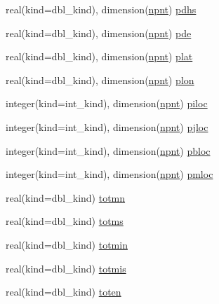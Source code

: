 \begin{DoxyCompactItemize}
\item 
real(kind=dbl\_\-kind), dimension(\hyperlink{namespaceice__diagnostics_aab9ed37bb736e9c83d4bf276c8010dc2}{npnt}) \hyperlink{namespaceice__diagnostics_aafb0c3e7a68ebfdd564e56305618c799}{pdhs}
\item 
real(kind=dbl\_\-kind), dimension(\hyperlink{namespaceice__diagnostics_aab9ed37bb736e9c83d4bf276c8010dc2}{npnt}) \hyperlink{namespaceice__diagnostics_afaeca519ef7de2238cb47f6f1b6c3032}{pde}
\item 
real(kind=dbl\_\-kind), dimension(\hyperlink{namespaceice__diagnostics_aab9ed37bb736e9c83d4bf276c8010dc2}{npnt}) \hyperlink{namespaceice__diagnostics_a463e02d524db51f3b7cfe43b74753ea7}{plat}
\item 
real(kind=dbl\_\-kind), dimension(\hyperlink{namespaceice__diagnostics_aab9ed37bb736e9c83d4bf276c8010dc2}{npnt}) \hyperlink{namespaceice__diagnostics_a19e637460f07e8d9b9b9973903ec467a}{plon}
\item 
integer(kind=int\_\-kind), dimension(\hyperlink{namespaceice__diagnostics_aab9ed37bb736e9c83d4bf276c8010dc2}{npnt}) \hyperlink{namespaceice__diagnostics_a1b77eb5ad27f3307cbff090ad8011f0a}{piloc}
\item 
integer(kind=int\_\-kind), dimension(\hyperlink{namespaceice__diagnostics_aab9ed37bb736e9c83d4bf276c8010dc2}{npnt}) \hyperlink{namespaceice__diagnostics_a6ba83151bf36d6683bf55801185296ca}{pjloc}
\item 
integer(kind=int\_\-kind), dimension(\hyperlink{namespaceice__diagnostics_aab9ed37bb736e9c83d4bf276c8010dc2}{npnt}) \hyperlink{namespaceice__diagnostics_afb89b35222316a961a8e669d4c3a8e9a}{pbloc}
\item 
integer(kind=int\_\-kind), dimension(\hyperlink{namespaceice__diagnostics_aab9ed37bb736e9c83d4bf276c8010dc2}{npnt}) \hyperlink{namespaceice__diagnostics_a265877fbf85570a11a36cee45d4b1044}{pmloc}
\item 
real(kind=dbl\_\-kind) \hyperlink{namespaceice__diagnostics_a07a894a84b541e5cdb03c7b30cfa6bdd}{totmn}
\item 
real(kind=dbl\_\-kind) \hyperlink{namespaceice__diagnostics_abdb06061e5db5f354797848bbd36dbb2}{totms}
\item 
real(kind=dbl\_\-kind) \hyperlink{namespaceice__diagnostics_a810e9254a399aaee3f3bc9f45fda5616}{totmin}
\item 
real(kind=dbl\_\-kind) \hyperlink{namespaceice__diagnostics_a34eaaab8fe90658931ee055c55fa4ef6}{totmis}
\item 
real(kind=dbl\_\-kind) \hyperlink{namespaceice__diagnostics_a2ca0dd7abee30b5f5efc72fc53a8e1a2}{toten}

\end{DoxyCompactItemize}
